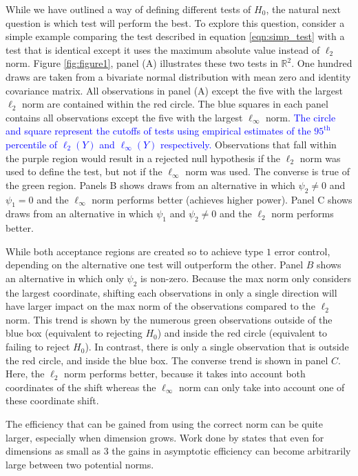 \documentclass{article}
\newcommand{\rvt}{Y}
\begin{document}
While we have outlined a way of defining different tests of $H_0$, the natural next question is which test will perform the best.  To explore this question, consider a simple example comparing the test described in equation \eqref{eqn:simp_test} with a test that is identical except it uses the maximum absolute value instead of $\ell_2$ norm.  Figure \ref{fig:figure1}, panel (A) illustrates these two tests in $\mathbb{R}^2$. One hundred draws are taken from a bivariate normal distribution with mean zero and identity covariance matrix. All observations in panel (A) except the five with the largest $\ell_2$ norm are contained within the red circle. The blue squares in each panel contains all observations except the five with the largest $\ell_\infty$ norm. 
\textcolor{blue}{The circle and square represent the cutoffs of tests using empirical estimates of the $95^{\text{th}}$ percentile of $\ell_2(\rvt)$ and $\ell_\infty(\rvt)$ respectively.}
Observations that fall within the purple region would result in a rejected null hypothesis if the $\ell_2$ norm was used to define the test, but not if the $\ell_\infty$ norm was used. The converse is true of the green region. Panels B shows draws from an alternative in which $\psi_2 \ne 0$ and $\psi_1 = 0$ and the $\ell_\infty$ norm performs better (achieves higher power). Panel C shows draws from an alternative in which $\psi_1$ and $\psi_2 \neq 0$ and the $\ell_2$ norm performs better. 

While both acceptance regions are created so to achieve type $1$ error control, depending on the alternative one test will outperform the other. Panel $B$ shows an alternative in which only $\psi_2$ is non-zero.  Because the max norm only considers the largest coordinate, shifting each observations in only a single direction will have larger impact on the max norm of the observations compared to the $\ell_2$ norm.  This trend is shown by the numerous green observations outside of the blue box (equivalent to rejecting $H_0$) and inside the red circle (equivalent to failing to reject $H_0$). In contrast, there is only a single observation that is outside the red circle, and inside the blue box. The converse trend is shown in panel $C$. Here, the $\ell_2$ norm performs better, because it takes into account both coordinates of the shift whereas the $\ell_\infty$ norm can only take into account one of these coordinate shift. 

The efficiency that can be gained from using the correct norm can be quite larger, especially when dimension grows.  Work done by \citep{pinelis_schur2-concavity_2014} states that even for dimensions as small as $3$ the gains in asymptotic efficiency can become arbitrarily large between two potential norms.  
\end{document}
